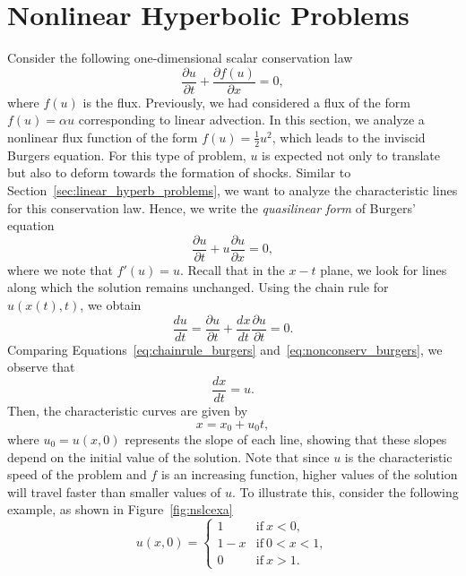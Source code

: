 \section{Nonlinear Hyperbolic Problems}
Consider the following one-dimensional scalar conservation law
\begin{equation}
	\frac{\partial u}{\partial t} + \frac{\partial f(u)}{\partial x} = 0,
\end{equation}
where $f(u)$ is the flux. Previously, we had considered a flux of the form $f(u)=\alpha u$ corresponding to linear advection. In this section, we analyze a nonlinear flux function of the form $f(u)=\frac{1}{2} u^2$, which leads to the inviscid Burgers equation. For this type of problem, $u$ is expected not only to translate but also to deform towards the formation of shocks. Similar to Section~\ref{sec:linear_hyperb_problems}, we want to analyze the characteristic lines for this conservation law. Hence, we write the \textit{quasilinear form} of Burgers' equation
\begin{equation}
	\frac{\partial u}{\partial t} + u\frac{\partial u}{\partial x} = 0,
	\label{eq:nonconserv_burgers}
\end{equation}
where we note that $f'(u) = u$. Recall that in the $x-t$ plane, we look for lines along which the solution remains unchanged. Using the chain rule for $u(x(t), t)$, we obtain
\begin{equation}
	\frac{du}{dt} = \frac{\partial u}{\partial t} + \frac{dx}{dt}\frac{\partial u}{\partial t} = 0.
	\label{eq:chainrule_burgers}
\end{equation}
Comparing Equations~\ref{eq:chainrule_burgers} and~\ref{eq:nonconserv_burgers}, we observe that
\begin{equation}
	\frac{dx}{dt} = u.
\end{equation}
Then, the characteristic curves are given by
\begin{equation}
	x = x_0 + u_0 t,
	\label{eq:charact_burgers}
\end{equation}
where $u_0=u(x,0)$ represents the slope of each line, showing that these slopes depend on the initial value of the solution. Note that since $u$ is the characteristic speed of the problem and $f$ is an increasing function, higher values of the solution will travel faster than smaller values of $u$. To illustrate this, consider the following example, as shown in Figure~\ref{fig:nslcexa}
\begin{equation}
	u(x,0) = 
	\begin{cases}
		1 & \text{if}~x < 0,\\
		1-x & \text{if}~0<x<1, \\ 
		0 & \text{if}~x>1.
	\end{cases}
	\label{eq:nlscex0}
\end{equation}

